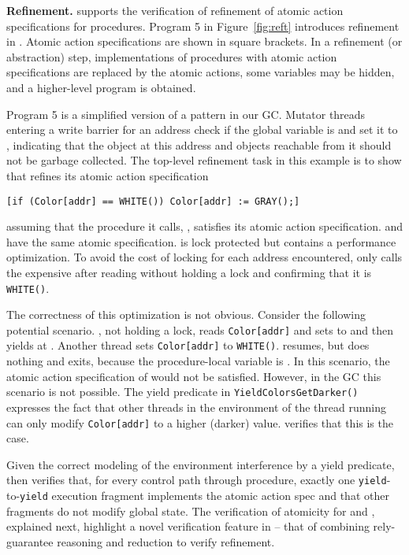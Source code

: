 %

{\bf Refinement.} 
\civl supports the verification of refinement of atomic action specifications for
procedures. Program 5 in Figure~\ref{fig:reft} introduces refinement in \civl. 
Atomic action specifications are shown in square brackets. 
In a refinement (or abstraction) step, implementations of procedures with atomic action
specifications are replaced by the atomic actions, some variables may
be hidden, and a higher-level program is obtained. 

Program 5 is a simplified version of a pattern in our GC.
Mutator threads entering a write barrier for an
address  check
if the global variable  is 
and set it to , indicating that the object at this address
and objects reachable from it should not be garbage collected. The
top-level refinement task in this example is to show that 
refines its atomic action specification 
\begin{verbatim}
[if (Color[addr] == WHITE()) Color[addr] := GRAY();]
\end{verbatim}
assuming that the procedure it calls, , satisfies its
atomic action specification.  and  have the same atomic
specification.   is lock protected but  contains a
performance optimization. 
To avoid the cost of locking for each
address encountered, 
 only calls the expensive 
 after reading  without holding a lock
and confirming that it is {\tt WHITE()}.


The correctness of this
optimization is not obvious. Consider the following potential
scenario. , not holding a lock, reads {\tt Color[addr]} and
sets  to  and then yields at
. Another thread sets {\tt Color[addr]} to
{\tt WHITE()}.  resumes, but does nothing and exits,
because the procedure-local variable  is . In this scenario, the atomic action
specification of  would not be satisfied. However, in the GC this
scenario is not possible. 
The yield
predicate in {\tt YieldColorsGetDarker()} expresses the fact that
other threads in the environment of the thread running  can
only modify {\tt Color[addr]} to a higher (darker)
value. \civl verifies that this is the case. 

Given the correct
modeling of the environment interference by a yield predicate,
\civl then verifies that, for every control path through 
procedure, exactly one {\tt yield}-to-{\tt yield} execution
fragment implements the atomic action spec and that other fragments do not modify
global state. The verification of atomicity for  and
, explained next, highlight a
novel verification feature in \civl -- that of combining
rely-guarantee reasoning and reduction to verify refinement.

